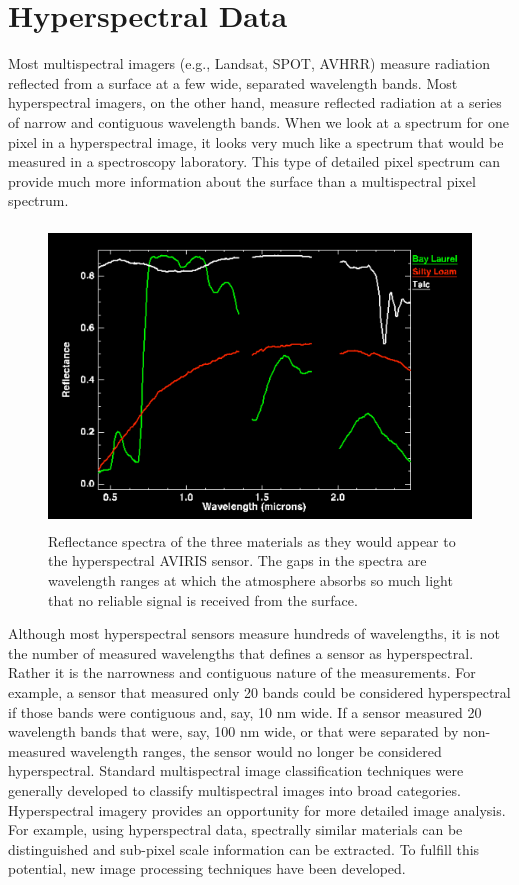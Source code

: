 \documentclass[document.tex]{subfiles}
\begin{document}
\section{Hyperspectral Data}
Most multispectral imagers (e.g., Landsat, SPOT, AVHRR) measure radiation reflected
from a surface at a few wide, separated wavelength bands. Most hyperspectral
imagers, on the other hand, measure reflected radiation at a series of narrow
and contiguous wavelength bands. When we look at a spectrum for one pixel in a
hyperspectral image, it looks very much like a spectrum that would be measured in a
spectroscopy laboratory. This type of detailed pixel spectrum can provide much
more information about the surface than a multispectral pixel spectrum.
\begin{figure}[H]
	\begin{center}
		\includegraphics[height=8.0cm]{imgs/Atmosphere.png}
	\end{center}
	\caption{Reflectance spectra of the three materials as they would appear to the hyperspectral AVIRIS sensor. The gaps in the spectra are wavelength ranges at which the atmosphere absorbs so much light that no reliable signal is received from the surface.\cite{35}}
	\label{fig: Effect of atmospheric absorbtion over hyperspectral data}
\end{figure}
\noindent Although most hyperspectral sensors measure hundreds of wavelengths, it is not the
number of measured wavelengths that defines a sensor as hyperspectral. Rather it is the
narrowness and contiguous nature of the measurements. For example, a sensor that
measured only 20 bands could be considered hyperspectral if those bands were
contiguous and, say, 10 nm wide. If a sensor measured 20 wavelength bands that were,
say, 100 nm wide, or that were separated by non-measured wavelength ranges, the sensor
would no longer be considered hyperspectral.
\noindent Standard multispectral image classification techniques were generally developed to
classify multispectral images into broad categories. Hyperspectral imagery provides an
opportunity for more detailed image analysis. For example, using hyperspectral data,
spectrally similar materials can be distinguished\cite{6} and sub-pixel scale information can be extracted. To fulfill this potential, new image processing techniques have been
developed.
\end{document}
